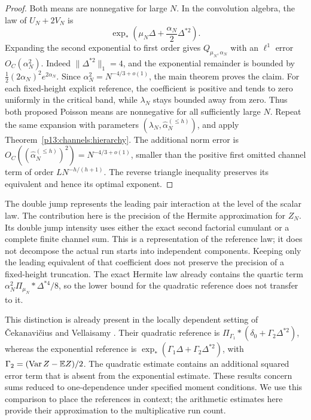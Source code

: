 \begin{proof}
Both means are nonnegative for large \(N\).
In the convolution algebra, the law of \(U_N+2V_N\) is
\[
 \exp_*\left(\mu_N\Delta+\frac{\alpha_N}{2}\Delta^{*2}\right).
\]
Expanding the second exponential to first order gives
\(Q_{\mu_N,\alpha_N}\) with an \(\ell^1\) error
\(O_C(\alpha_N^2)\). Indeed \(\|\Delta^{*2}\|_1=4\),
and the exponential remainder is bounded by
\(\frac12(2\alpha_N)^2e^{2\alpha_N}\).
Since \(\alpha_N^2=N^{-4/3+o(1)}\), the main theorem
proves the claim.
For each fixed-height explicit reference, the coefficient
is positive and tends to zero uniformly in the critical band, while
\(\lambda_N\) stays bounded away from zero. Thus both proposed
Poisson means are nonnegative for all sufficiently large \(N\).
Repeat the same expansion with parameters
\((\lambda_N,\widehat\alpha_N^{(\le h)})\), and apply
Theorem~\ref{p13:channels:hierarchy}. The additional norm
error is \(O_C((\widehat\alpha_N^{(\le h)})^2)
=N^{-4/3+o(1)}\), smaller than the positive first omitted
channel term of order \(LN^{-h/(h+1)}\).
The reverse triangle inequality preserves its equivalent
and hence its optimal exponent.
\end{proof}

The double jump represents the leading pair interaction at
the level of the scalar law. The contribution here is the
precision of the Hermite approximation for \(Z_N\).
Its double jump intensity uses either the exact second
factorial cumulant or a complete finite channel sum.
This is a representation of the reference law; it does not
decompose the actual run starts into independent components.
Keeping only the leading equivalent of that coefficient
does not preserve the precision of a fixed-height truncation.
The exact Hermite law already contains the quartic term
\(\alpha_N^2\Pi_{\mu_N}*\Delta^{*4}/8\), so the lower
bound for the quadratic reference does not transfer to it.

This distinction is already present in the locally dependent
setting of \v{C}ekanavi\v{c}ius and Vellaisamy
\cite[Theorem~3.1, (3.5), and Theorem~3.2, (3.6)]{cekanaviciusvellaisamy2015}.
Their quadratic reference is
\(\Pi_{\Gamma_1}*(\delta_0+\Gamma_2\Delta^{*2})\), whereas
the exponential reference is
\(\exp_*(\Gamma_1\Delta+\Gamma_2\Delta^{*2})\), with
\(\Gamma_2=(\operatorname{Var} Z-\mathbb E Z)/2\).
The quadratic estimate contains an additional squared error term
that is absent from the exponential estimate.
These results concern sums reduced to one-dependence under
specified moment conditions. We use this comparison to place the
references in context; the arithmetic estimates here provide
their approximation to the multiplicative run count.

